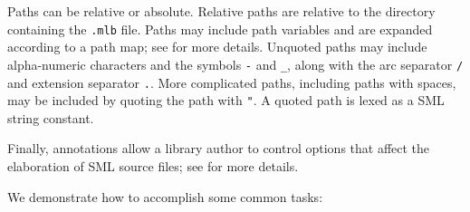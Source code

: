 Paths can be relative or absolute.  Relative paths are relative to the
directory containing the {\tt .mlb} file.  Paths may include path
variables and are expanded according to a path map; see
 for more details.  Unquoted paths may include
alpha-numeric characters and the symbols {\tt -} and {\tt \_}, along
with the arc separator {\tt /} and extension separator {\tt .}.  More
complicated paths, including paths with spaces, may be included by
quoting the path with {\tt "}.  A quoted path is lexed as a SML string
constant.

Finally, annotations allow a library author to control options that
affect the elaboration of SML source files; see  for
more details.

%

We demonstrate how to accomplish some common tasks:
